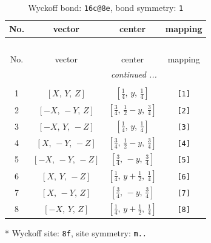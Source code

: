 \documentclass[fleqn,8pt]{jsarticle}
\begin{document}
\renewcommand{\arraystretch}{1.2}
\begin{longtable}{cccc}
\caption{Wyckoff bond: {\tt 16c@8e}, bond symmetry: {\tt 1}}
 \\
 \hline \hline
No. & vector & center & mapping \\ \hline \endfirsthead

\multicolumn{3}{l}{\tablename\ \thetable{}} \\
 \hline \hline
No. & vector & center & mapping \\ \hline \endhead

 \hline \hline
\multicolumn{3}{r}{\footnotesize\it continued ...} \\ \endfoot

 \hline \hline
\multicolumn{3}{r}{} \\ \endlastfoot

1 & $\left[ X,\, Y,\, Z \right]$ & $\left[ \frac{1}{4},\, y,\, \frac{1}{4} \right]$ & {\tt [1]} \\ \hline
2 & $\left[ - X,\, - Y,\, Z \right]$ & $\left[ \frac{3}{4},\, \frac{1}{2} - y,\, \frac{3}{4} \right]$ & {\tt [2]} \\ \hline
3 & $\left[ - X,\, Y,\, - Z \right]$ & $\left[ \frac{1}{4},\, y,\, \frac{1}{4} \right]$ & {\tt [3]} \\ \hline
4 & $\left[ X,\, - Y,\, - Z \right]$ & $\left[ \frac{3}{4},\, \frac{1}{2} - y,\, \frac{3}{4} \right]$ & {\tt [4]} \\ \hline
5 & $\left[ - X,\, - Y,\, - Z \right]$ & $\left[ \frac{3}{4},\, - y,\, \frac{3}{4} \right]$ & {\tt [5]} \\ \hline
6 & $\left[ X,\, Y,\, - Z \right]$ & $\left[ \frac{1}{4},\, y + \frac{1}{2},\, \frac{1}{4} \right]$ & {\tt [6]} \\ \hline
7 & $\left[ X,\, - Y,\, Z \right]$ & $\left[ \frac{3}{4},\, - y,\, \frac{3}{4} \right]$ & {\tt [7]} \\ \hline
8 & $\left[ - X,\, Y,\, Z \right]$ & $\left[ \frac{1}{4},\, y + \frac{1}{2},\, \frac{1}{4} \right]$ & {\tt [8]} \\
\end{longtable}
* Wyckoff site: {\tt 8f}, site symmetry: {\tt m..}
\renewcommand{\arraystretch}{1.2}
\end{document}
